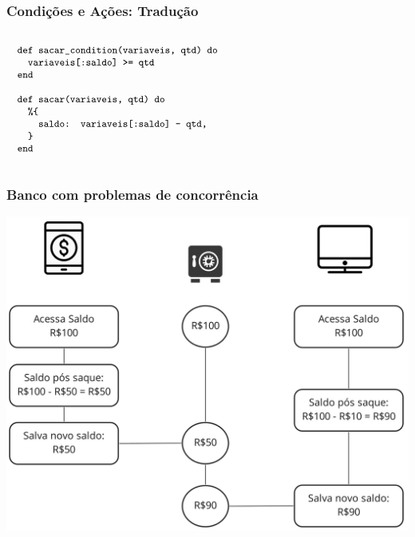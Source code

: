 \documentclass{beamer}
\begin{document}
\begin{frame}
  \frametitle{Condições e Ações: Tradução}
  $\progfig{
  ~~def sacar\_condition(variaveis, qtd) do\\
  ~~~~variaveis[:saldo] >= qtd\\
  ~~end\\\\
  ~~def sacar(variaveis, qtd) do\\
  ~~~~\%\{\\
  ~~~~~~saldo: variaveis[:saldo] - qtd,\\
  ~~~~\}\\
  ~~end
  }$
\end{frame}

\begin{frame}
  \frametitle{Banco com problemas de concorrência}
  \includegraphics[scale=0.15]{img/bank1.png}
\end{frame}  
\end{document}

